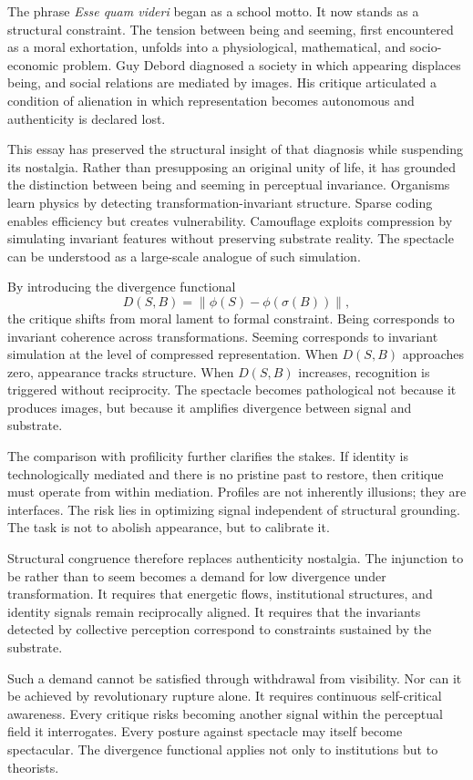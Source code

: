 \documentclass[11pt]{article}
\begin{document}
The phrase \textit{Esse quam videri} began as a school motto. It now stands as a structural constraint. The tension between being and seeming, first encountered as a moral exhortation, unfolds into a physiological, mathematical, and socio-economic problem. Guy Debord diagnosed a society in which appearing displaces being, and social relations are mediated by images. His critique articulated a condition of alienation in which representation becomes autonomous and authenticity is declared lost.

This essay has preserved the structural insight of that diagnosis while suspending its nostalgia. Rather than presupposing an original unity of life, it has grounded the distinction between being and seeming in perceptual invariance. Organisms learn physics by detecting transformation-invariant structure. Sparse coding enables efficiency but creates vulnerability. Camouflage exploits compression by simulating invariant features without preserving substrate reality. The spectacle can be understood as a large-scale analogue of such simulation.

By introducing the divergence functional
\[
D(S,B) = \|\phi(S) - \phi(\sigma(B))\|,
\]
the critique shifts from moral lament to formal constraint. Being corresponds to invariant coherence across transformations. Seeming corresponds to invariant simulation at the level of compressed representation. When $D(S,B)$ approaches zero, appearance tracks structure. When $D(S,B)$ increases, recognition is triggered without reciprocity. The spectacle becomes pathological not because it produces images, but because it amplifies divergence between signal and substrate.

The comparison with profilicity further clarifies the stakes. If identity is technologically mediated and there is no pristine past to restore, then critique must operate from within mediation. Profiles are not inherently illusions; they are interfaces. The risk lies in optimizing signal independent of structural grounding. The task is not to abolish appearance, but to calibrate it.

Structural congruence therefore replaces authenticity nostalgia. The injunction to be rather than to seem becomes a demand for low divergence under transformation. It requires that energetic flows, institutional structures, and identity signals remain reciprocally aligned. It requires that the invariants detected by collective perception correspond to constraints sustained by the substrate.

Such a demand cannot be satisfied through withdrawal from visibility. Nor can it be achieved by revolutionary rupture alone. It requires continuous self-critical awareness. Every critique risks becoming another signal within the perceptual field it interrogates. Every posture against spectacle may itself become spectacular. The divergence functional applies not only to institutions but to theorists.
\end{document}
